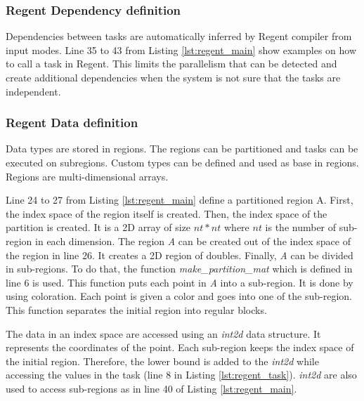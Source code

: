 

\subsubsection{Regent Dependency definition}
Dependencies between tasks are automatically inferred by Regent compiler from input modes.
Line 35 to 43 from Listing \ref{lst:regent_main} show examples on how to call a task in Regent.
This limits the parallelism that can be detected and create additional dependencies when the system is not sure that the tasks are independent.



\subsubsection{Regent Data definition}
Data types are stored in regions.
The regions can be partitioned and tasks can be executed on subregions.
Custom types can be defined and used as base in regions.
Regions are multi-dimensional arrays.

Line 24 to 27 from Listing \ref{lst:regent_main} define a partitioned region A.
First, the index space of the region itself is created.
Then, the index space of the partition is created.
It is a 2D array of size $nt * nt$ where $nt$ is the number of sub-region in each dimension.
The region \textit{A} can be created out of the index space of the region in line 26.
It creates a 2D region of doubles.
Finally, \textit{A} can be divided in sub-regions.
To do that, the function \textit{make\_partition\_mat} which is defined in line 6 is used.
This function puts each point in \textit{A} into a sub-region.
It is done by using coloration.
Each point is given a color and goes into one of the sub-region.
This function separates the initial region into regular blocks.

The data in an index space are accessed using an \textit{int2d} data structure.
It represents the coordinates of the point.
Each sub-region keeps the index space of the initial region.
Therefore, the lower bound is added to the \textit{int2d} while accessing the values in the task (line 8 in Listing \ref{lst:regent_task}).
\textit{int2d} are also used to access sub-regions as in line 40 of Listing \ref{lst:regent_main}.


